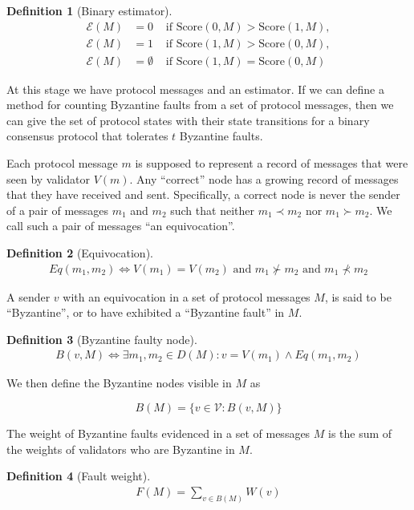 \documentclass{article}
\theoremstyle{definition}
\newtheorem{defn}{Definition}[section]
\begin{document}
\begin{defn}[Binary estimator]
\begin{align}
  \mathcal{E}(M) &= 0 &\text{ if } \text{Score}(0, M) > \text{Score}(1, M), \\
  \mathcal{E}(M) &= 1 &\text{ if } \text{Score}(1, M) > \text{Score}(0, M), \\
  \mathcal{E}(M) &= \emptyset &\text{ if } \text{Score}(1, M) = \text{Score}(0, M)
\end{align}
\end{defn}

At this stage we have protocol messages and an estimator. If we can define a method for counting Byzantine faults from a set of protocol messages, then we can give the set of protocol states with their state transitions for a binary consensus protocol that tolerates $t$ Byzantine faults.

Each protocol message $m$ is supposed to represent a record of messages that were seen by validator $V(m)$. Any ``correct'' node has a growing record of messages that they have received and sent. Specifically, a correct node is never the sender of a pair of messages $m_1$ and $m_2$ such that neither $m_1 \prec m_2$ nor $m_1 \succ m_2$. We call such a pair of messages ``an equivocation''.


\begin{defn}[Equivocation]
\begin{align}
Eq(m_1, m_2) \iff V(m_1) = V(m_2) \text{ and } m_1 \nsucc m_2 \text{ and } m_1 \nprec m_2
\end{align}
\end{defn}

A sender $v$ with an equivocation in a set of protocol messages $M$, is said to be ``Byzantine'', or to have exhibited a ``Byzantine fault'' in $M$.

\begin{defn}[Byzantine faulty node]
\begin{align}
B(v,M) \iff \exists m_1, m_2 \in D(M) : v = V(m_1) \land Eq(m_1, m_2)
\end{align}
\end{defn}

We then define the Byzantine nodes visible in $M$ as

$$
B(M) = \{v \in \mathcal{V}: B(v,M)\}
$$

The weight of Byzantine faults evidenced in a set of messages $M$ is the sum of the weights of validators who are Byzantine in $M$.

\begin{defn}[Fault weight]
\begin{align}
F(M) = \sum_{v \in B(M)} W(v)
\end{align}
\end{defn}
\end{document}
